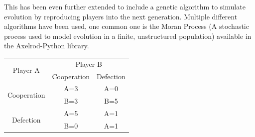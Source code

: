 \documentclass[twoside,twocolumn]{article}
\begin{document}
This has been even further extended to include a genetic algorithm to simulate evolution by reproducing players into the next generation. Multiple different algorithms have been used, one common one is the Moran Process (A stochastic process used to model evolution in a finite, unstructured population) available in the Axelrod-Python library. 
\begin{framed}
	\begin{center}
		\label{tab:payoffmatrix}
		\begin{tabular}{c|c|c}
		\multirow{2}{*}{Player A} & \multicolumn{2}{c}{Player B}\\		
		& Cooperation & Defection\\
		\hline
		\multirow{2}{*}{Cooperation} & A=3 & A=0\\
		& B=3 & B=5\\
		\hline
		\multirow{2}{*}{Defection} & A=5 & A=1\\
		& B=0 & A=1\\
		\end{tabular}
	\end{center}	
\end{framed}
\end{document}

